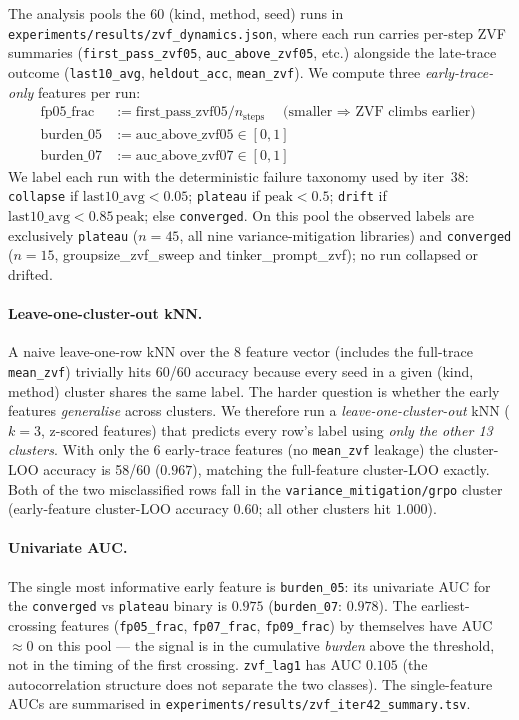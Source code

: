 \documentclass{article}
\begin{document}
The analysis pools the 60 (kind, method, seed) runs in
\texttt{experiments/results/zvf_dynamics.json}, where each run carries
per-step ZVF summaries (\texttt{first\_pass\_zvf05}, \texttt{auc\_above\_zvf05},
etc.) alongside the late-trace outcome (\texttt{last10\_avg},
\texttt{heldout\_acc}, \texttt{mean\_zvf}). We compute three
\emph{early-trace-only} features per run:
\begin{align*}
\mathrm{fp05\_frac} &:= \mathrm{first\_pass\_zvf05}/n_{\mathrm{steps}}
    \quad\text{(smaller $\Rightarrow$ ZVF climbs earlier)}\\
\mathrm{burden\_05} &:= \mathrm{auc\_above\_zvf05} \in [0,1]\\
\mathrm{burden\_07} &:= \mathrm{auc\_above\_zvf07} \in [0,1]
\end{align*}
We label each run with the deterministic failure taxonomy used by
iter~38: \texttt{collapse} if $\mathrm{last10\_avg}<0.05$;
\texttt{plateau} if $\mathrm{peak}<0.5$; \texttt{drift} if
$\mathrm{last10\_avg}<0.85\,\mathrm{peak}$; else \texttt{converged}.
On this pool the observed labels are exclusively \texttt{plateau}
($n{=}45$, all nine variance-mitigation libraries) and
\texttt{converged} ($n{=}15$, groupsize\_zvf\_sweep and
tinker\_prompt\_zvf); no run collapsed or drifted.

\paragraph{Leave-one-cluster-out kNN.}
A naive leave-one-row kNN over the 8 feature vector
(includes the full-trace \texttt{mean\_zvf}) trivially hits 60/60
accuracy because every seed in a given (kind, method) cluster shares
the same label. The harder question is whether the early features
\emph{generalise} across clusters. We therefore run a
\emph{leave-one-cluster-out} kNN ($k{=}3$, z-scored features) that
predicts every row's label using \emph{only the other 13 clusters}.
With only the 6 early-trace features (no \texttt{mean\_zvf} leakage)
the cluster-LOO accuracy is 58/60 ($0.967$), matching the full-feature
cluster-LOO exactly. Both of the two misclassified rows fall in the
\texttt{variance\_mitigation/grpo} cluster (early-feature cluster-LOO
accuracy $0.60$; all other clusters hit $1.000$).

\paragraph{Univariate AUC.}
The single most informative early feature is \texttt{burden\_05}: its
univariate AUC for the \texttt{converged} vs \texttt{plateau} binary
is $0.975$ (\texttt{burden\_07}: $0.978$). The earliest-crossing
features (\texttt{fp05\_frac}, \texttt{fp07\_frac}, \texttt{fp09\_frac})
by themselves have AUC $\approx 0$ on this pool — the signal is in
the cumulative \emph{burden} above the threshold, not in the timing
of the first crossing. \texttt{zvf\_lag1} has AUC $0.105$ (the
autocorrelation structure does not separate the two classes). The
single-feature AUCs are summarised in
\texttt{experiments/results/zvf_iter42_summary.tsv}.
\end{document}
